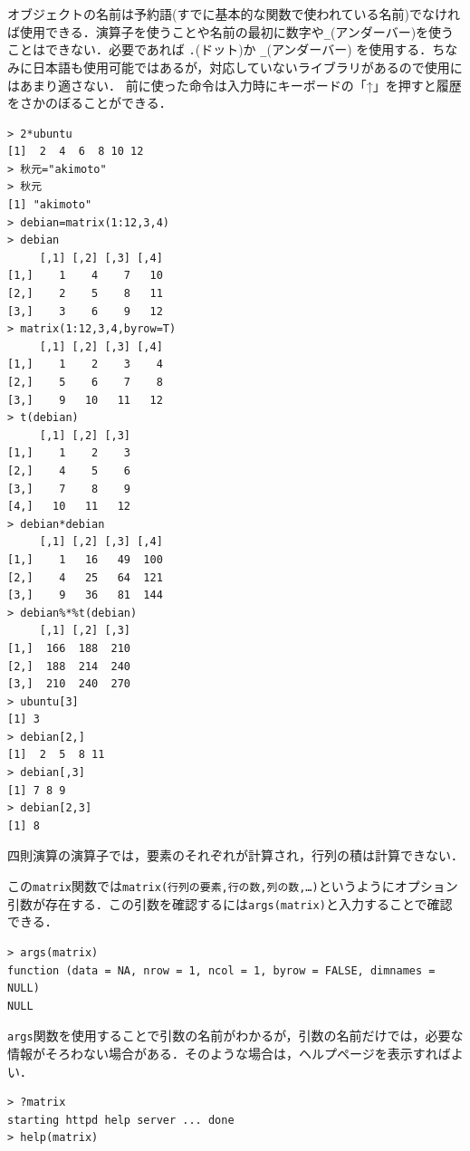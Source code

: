 オブジェクトの名前は予約語(すでに基本的な関数で使われている名前)でなければ使用できる．演算子を使うことや名前の最初に数字や\verb+_+(アンダーバー)を使うことはできない．必要であれば \verb+.+(ドット)か \verb+_+(アンダーバー) を使用する．ちなみに日本語も使用可能ではあるが，対応していないライブラリがあるので使用にはあまり適さない．
前に使った命令は入力時にキーボードの「↑」を押すと履歴をさかのぼることができる．
\begin{breakbox}
\begin{verbatim}
> 2*ubuntu
[1]  2  4  6  8 10 12
> 秋元="akimoto"
> 秋元
[1] "akimoto"
> debian=matrix(1:12,3,4)
> debian
     [,1] [,2] [,3] [,4]
[1,]    1    4    7   10
[2,]    2    5    8   11
[3,]    3    6    9   12
> matrix(1:12,3,4,byrow=T)
     [,1] [,2] [,3] [,4]
[1,]    1    2    3    4
[2,]    5    6    7    8
[3,]    9   10   11   12
> t(debian)
     [,1] [,2] [,3]
[1,]    1    2    3
[2,]    4    5    6
[3,]    7    8    9
[4,]   10   11   12
> debian*debian
     [,1] [,2] [,3] [,4]
[1,]    1   16   49  100
[2,]    4   25   64  121
[3,]    9   36   81  144
> debian%*%t(debian)
     [,1] [,2] [,3]
[1,]  166  188  210
[2,]  188  214  240
[3,]  210  240  270
> ubuntu[3]
[1] 3
> debian[2,]
[1]  2  5  8 11
> debian[,3]
[1] 7 8 9
> debian[2,3]
[1] 8
\end{verbatim}
\end{breakbox}

四則演算の演算子では，要素のそれぞれが計算され，行列の積は計算できない．

この{\tt matrix}関数では\verb+matrix(行列の要素,行の数,列の数,…)+というようにオプション引数が存在する．この引数を確認するには\verb+args(matrix)+と入力することで確認できる．
\begin{breakbox}
\begin{verbatim}
> args(matrix)
function (data = NA, nrow = 1, ncol = 1, byrow = FALSE, dimnames = NULL) 
NULL
\end{verbatim}
\end{breakbox}

{\tt args}関数を使用することで引数の名前がわかるが，引数の名前だけでは，必要な情報がそろわない場合がある．そのような場合は，ヘルプページを表示すればよい．
\begin{breakbox}
\begin{verbatim}
> ?matrix
starting httpd help server ... done
> help(matrix)
\end{verbatim}
\end{breakbox}


